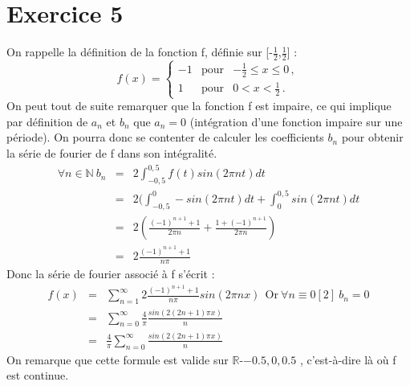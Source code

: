 \documentclass{article}
\begin{document}
\section{Exercice 5}
On rappelle la définition de la fonction f, définie sur [-$\frac{1}{2}$,$\frac{1}{2}$] :
\begin{equation}
        \label{f} 
    f(x) = 
    \left\{
        \begin{array}{lll} 
                    -1 & \text{pour} & -\frac{1}{2} \le x \le 0 \,,\\ 
                    1 & \text{pour} & 0< x < \frac{1}{2} \,.
        \end{array}
    \right.
\end{equation}
On peut tout de suite remarquer que la fonction f est impaire, ce qui implique par définition de $a_n$ et $b_n$ que $a_n = 0$ (intégration d'une fonction impaire sur une période). On pourra donc se contenter de calculer les coefficients $b_n$ pour obtenir la série de fourier de f dans son intégralité.
\begin{eqnarray*}
    \forall n \in \mathbb{N}\ b_n &=& 2\int_{-0,5}^{0,5} f(t)sin(2\pi nt)dt\\
                                  &=& 2(\int_{-0,5}^0 -sin(2\pi nt)dt +\int_{0}^{0,5} sin(2\pi nt)dt\\
                                  &=& 2(\frac{(-1)^{n+1}+1}{2\pi n} + \frac{1+(-1)^{n+1}}{2\pi n})\\
                                  &=& 2\frac{(-1)^{n+1}+1}{n\pi}
\end{eqnarray*}
Donc la série de fourier associé à f s'écrit : 
\begin{eqnarray*}
    f(x) &=& \sum_{n=1}^{\infty} 2\frac{(-1)^{n+1}+1}{n\pi}sin(2\pi nx)\ \ \text{Or}\ \forall n \equiv 0 [2]\  b_n=0\\
         &=& \sum_{n=0}^{\infty} \frac{4}{\pi} \frac{sin(2(2n+1)\pi x)}{n}\\
         &=& \frac{4}{\pi}\sum_{n=0}^{\infty} \frac{sin(2(2n+1)\pi x)}{n}
\end{eqnarray*}
On remarque que cette formule est valide sur $\mathbb{R}$-$\left . -0.5,0,0.5\right .$ , c'est-à-dire là où f est continue.
\end{document}
